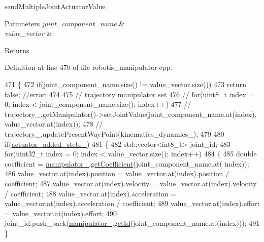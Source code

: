 send\+Multiple\+Joint\+Actuator\+Value 


\begin{DoxyParams}{Parameters}
{\em joint\+\_\+component\+\_\+name} & \\
\hline
{\em value\+\_\+vector} & \\
\hline
\end{DoxyParams}
\begin{DoxyReturn}{Returns}

\end{DoxyReturn}


Definition at line 470 of file robotis\+\_\+manipulator.\+cpp.


\begin{DoxyCode}
471 \{
472   \textcolor{keywordflow}{if}(joint\_component\_name.size() != value\_vector.size())
473     \textcolor{keywordflow}{return} \textcolor{keyword}{false}; \textcolor{comment}{//error;}
474 
475   \textcolor{comment}{// trajectory manipulator set}
476   \textcolor{comment}{// for(uint8\_t index = 0; index < joint\_component\_name.size(); index++)}
477   \textcolor{comment}{//   trajectory\_.getManipulator()->setJointValue(joint\_component\_name.at(index), value\_vector.at(index));}
478   \textcolor{comment}{// trajectory\_.updatePresentWayPoint(kinematics\_dynamics\_);}
479 
480   \textcolor{keywordflow}{if}(\hyperlink{classrobotis__manipulator_1_1_robotis_manipulator_a02073b7982b992642b28acfa35a17769}{actuator\_added\_stete\_})
481   \{
482     std::vector<int8\_t> joint\_id;
483     \textcolor{keywordflow}{for}(uint32\_t index = 0; index < value\_vector.size(); index++)
484     \{
485       \textcolor{keywordtype}{double} coefficient = \hyperlink{classrobotis__manipulator_1_1_robotis_manipulator_a5b2df4a3b3ee7f408cb1d0eaf61644dc}{manipulator\_}.\hyperlink{classrobotis__manipulator_1_1_manipulator_a437ac5f137aa788c4db07690c185e9ba}{getCoefficient}(joint\_component\_name.at(
      index));
486       value\_vector.at(index).position = value\_vector.at(index).position / coefficient;
487       value\_vector.at(index).velocity = value\_vector.at(index).velocity / coefficient;
488       value\_vector.at(index).acceleration = value\_vector.at(index).acceleration / coefficient;
489       value\_vector.at(index).effort = value\_vector.at(index).effort;
490       joint\_id.push\_back(\hyperlink{classrobotis__manipulator_1_1_robotis_manipulator_a5b2df4a3b3ee7f408cb1d0eaf61644dc}{manipulator\_}.\hyperlink{classrobotis__manipulator_1_1_manipulator_a60db34ef6a62e0b15aa36f9b1571640d}{getId}(joint\_component\_name.at(index)));
491     \}

\end{DoxyCode}
